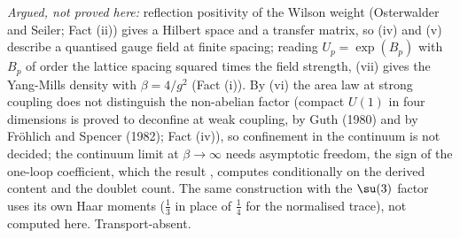 \emph{Argued, not proved here:} reflection positivity of the Wilson weight (Osterwalder and Seiler; Fact (ii)) gives a Hilbert space and a transfer matrix, so (iv) and (v) describe a quantised gauge field at finite spacing; reading $U_p = \exp(B_p)$ with $B_p$ of order the lattice spacing squared times the field strength, (vii) gives the Yang-Mills density with $\beta = 4/g^2$ (Fact (i)). By (vi) the area law at strong coupling does not distinguish the non-abelian factor (compact $U(1)$ in four dimensions is proved to deconfine at weak coupling, by Guth (1980) and by Fr\"ohlich and Spencer (1982); Fact (iv)), so confinement in the continuum is not decided; the continuum limit at $\beta \to \infty$ needs asymptotic freedom, the sign of the one-loop coefficient, which the result , computes conditionally on the derived content and the doublet count. The same construction with the $\su(3)$ factor uses its own Haar moments ($\tfrac13$ in place of $\tfrac14$ for the normalised trace), not computed here. Transport-absent.
